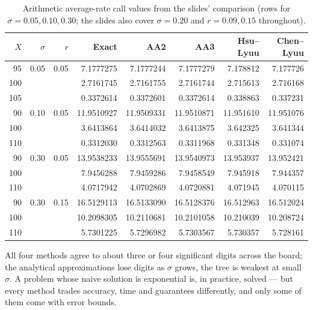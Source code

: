 \begin{table}[H]
	\centering
	\small
	\begin{tabular}{rrrrrrrr}
		\toprule
		$X$ & $\sigma$ & $r$  & Exact      & AA2        & AA3        & Hsu--Lyuu & Chen--Lyuu \\
		\midrule
		95  & 0.05     & 0.05 & 7.1777275  & 7.1777244  & 7.1777279  & 7.178812  & 7.177726   \\
		100 &          &      & 2.7161745  & 2.7161755  & 2.7161744  & 2.715613  & 2.716168   \\
		105 &          &      & 0.3372614  & 0.3372601  & 0.3372614  & 0.338863  & 0.337231   \\
		\midrule
		90  & 0.10     & 0.05 & 11.9510927 & 11.9509331 & 11.9510871 & 11.951610 & 11.951076  \\
		100 &          &      & 3.6413864  & 3.6414032  & 3.6413875  & 3.642325  & 3.641344   \\
		110 &          &      & 0.3312030  & 0.3312563  & 0.3311968  & 0.331348  & 0.331074   \\
		\midrule
		90  & 0.30     & 0.05 & 13.9538233 & 13.9555691 & 13.9540973 & 13.953937 & 13.952421  \\
		100 &          &      & 7.9456288  & 7.9459286  & 7.9458549  & 7.945918  & 7.944357   \\
		110 &          &      & 4.0717942  & 4.0702869  & 4.0720881  & 4.071945  & 4.070115   \\
		\midrule
		90  & 0.30     & 0.15 & 16.5129113 & 16.5133090 & 16.5128376 & 16.512963 & 16.512024  \\
		100 &          &      & 10.2098305 & 10.2110681 & 10.2101058 & 10.210039 & 10.208724  \\
		110 &          &      & 5.7301225  & 5.7296982  & 5.7303567  & 5.730357  & 5.728161   \\
		\bottomrule
	\end{tabular}
	\caption{Arithmetic average-rate call values from the slides' comparison
		(rows for $\sigma=0.05,0.10,0.30$; the slides also cover $\sigma=0.20$ and
		$r=0.09,0.15$ throughout).}
	\label{tab:asian-comparison}
\end{table}

\suppstart
{}

\begin{moral}
	All four methods agree to about three or four significant digits across the board; the analytical approximations lose digits as $\sigma$ grows, the tree is weakest at small $\sigma$.
	A problem whose naive solution is exponential is, in practice, solved --- but every method trades accuracy, time and guarantees differently, and only some of them come with error bounds.
\end{moral}

\suppend
